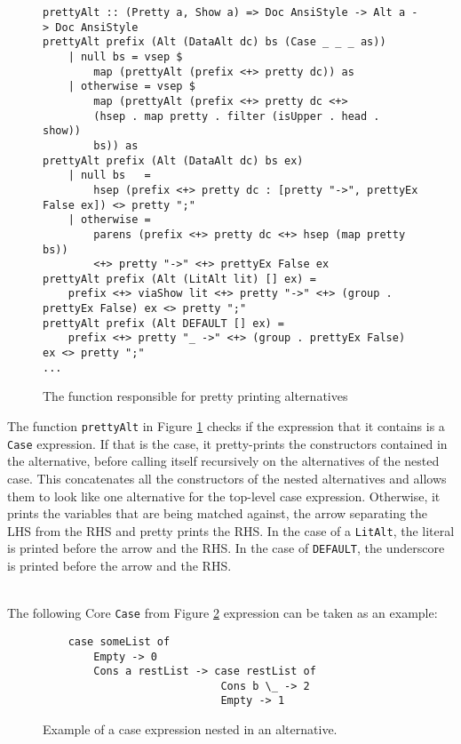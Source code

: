 \begin{figure}[!ht]
\begin{verbatim}
prettyAlt :: (Pretty a, Show a) => Doc AnsiStyle -> Alt a -> Doc AnsiStyle
prettyAlt prefix (Alt (DataAlt dc) bs (Case _ _ _ as))
    | null bs = vsep $
        map (prettyAlt (prefix <+> pretty dc)) as
    | otherwise = vsep $
        map (prettyAlt (prefix <+> pretty dc <+>
        (hsep . map pretty . filter (isUpper . head . show))
        bs)) as
prettyAlt prefix (Alt (DataAlt dc) bs ex)
    | null bs   =
        hsep (prefix <+> pretty dc : [pretty "->", prettyEx False ex]) <> pretty ";"
    | otherwise =
        parens (prefix <+> pretty dc <+> hsep (map pretty bs))
        <+> pretty "->" <+> prettyEx False ex
prettyAlt prefix (Alt (LitAlt lit) [] ex) =
    prefix <+> viaShow lit <+> pretty "->" <+> (group . prettyEx False) ex <> pretty ";"
prettyAlt prefix (Alt DEFAULT [] ex) =
    prefix <+> pretty "_ ->" <+> (group . prettyEx False) ex <> pretty ";"
...
\end{verbatim}
    \caption{The function responsible for pretty printing alternatives}
    \label{fig:prettyAlt}
\end{figure}

The function \texttt{prettyAlt} in Figure \ref*{fig:prettyAlt} checks if the expression that it contains is a \texttt{Case} expression.
If that is the case, it pretty-prints the constructors contained in the alternative,
before calling itself recursively on the alternatives of the nested case.
This concatenates all the constructors of the nested alternatives and allows them to look like one alternative for the top-level case expression.
Otherwise, it prints the variables that are being matched against, the arrow separating the LHS from the RHS and pretty prints the RHS.
In the case of a \texttt{LitAlt}, the literal is printed before the arrow and the RHS.
In the case of \texttt{DEFAULT}, the underscore is printed before the arrow and the RHS.

\ \\
The following Core \texttt{Case} from Figure \ref*{fig:concatAltExample} expression can be taken as an example:

\begin{figure}[ht!]
\begin{verbatim}
    case someList of
        Empty -> 0
        Cons a restList -> case restList of
                            Cons b \_ -> 2
                            Empty -> 1
\end{verbatim}
    \caption{Example of a case expression nested in an alternative.}
    \label{fig:concatAltExample}
\end{figure}

